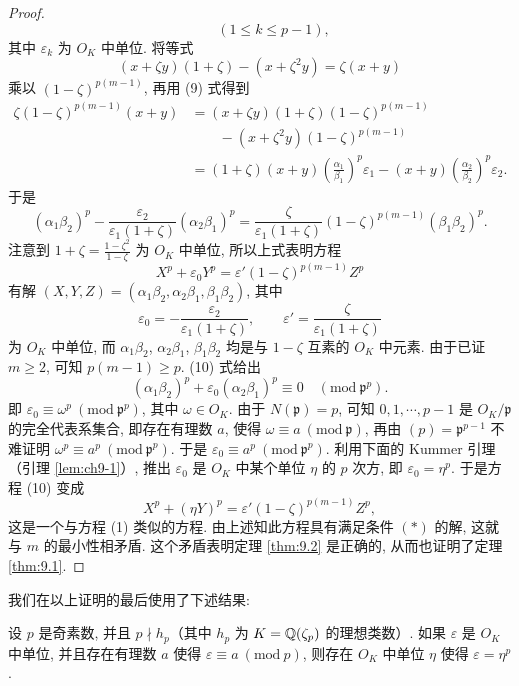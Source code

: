 \begin{proof}
\begin{equation}
  \qquad(1\leqslant k\leqslant p-1),
\end{equation}
其中 $\varepsilon_k$ 为 $O_K$ 中单位. 将等式
\[
  (x+\zeta y)(1+\zeta)-(x+\zeta^2y)=\zeta(x+y)
\]
乘以 $(1-\zeta)^{p(m-1)}$, 再用 (9) 式得到
\[
  \begin{aligned}
    \zeta(1-\zeta)^{p(m-1)}(x+y)&=(x+\zeta y)(1+\zeta)(1-\zeta)^{p(m-1)}\\
    &\qquad-(x+\zeta^2y)(1-\zeta)^{p(m-1)}\\
    &=(1+\zeta)(x+y)\left(\frac{\alpha_1}{\beta_1}\right)^p\varepsilon_1
    -(x+y)\left(\frac{\alpha_2}{\beta_2}\right)^p\varepsilon_2.
  \end{aligned}
\]
于是
\[
  \left(\alpha_1\beta_2\right)^p-\frac{\varepsilon_2}{\varepsilon_1(1+\zeta)}\left(\alpha_2\beta_1\right)^p
  =\frac{\zeta}{\varepsilon_1(1+\zeta)}(1-\zeta)^{p(m-1)}\left(\beta_1\beta_2\right)^p.
\]
注意到 $1+\zeta=\frac{1-\zeta^2}{1-\zeta}$ 为 $O_K$ 中单位, 所以上式表明方程
\begin{equation}\tag{10}
  X^p+\varepsilon_0Y^p=\varepsilon'(1-\zeta)^{p(m-1)}Z^p
\end{equation}
有解 $(X,Y,Z)=(\alpha_1\beta_2,\alpha_2\beta_1,\beta_1\beta_2)$, 其中
\[
  \varepsilon_0=-\frac{\varepsilon_2}{\varepsilon_1(1+\zeta)},\qquad
  \varepsilon'=\frac{\zeta}{\varepsilon_1(1+\zeta)}
\]
为 $O_K$ 中单位, 而 $\alpha_1\beta_2$, $\alpha_2\beta_1$, $\beta_1\beta_2$ 均是与 $1-\zeta$ 互素的 $O_K$ 中元素. 由于已证 $m\geqslant 2$, 可知 $p(m-1)\geqslant p$. (10) 式给出
\[
  (\alpha_1\beta_2)^p+\varepsilon_0(\alpha_2\beta_1)^p\equiv 0\quad(\mathrm{mod}\ \mathfrak{p}^p).
\]
即 $\varepsilon_0\equiv\omega^p\ (\mathrm{mod}\ \mathfrak{p}^p)$, 其中 $\omega\in O_K$. 由于 $N(\mathfrak{p})=p$, 可知 $0,1,\cdots,p-1$ 是 $O_K/\mathfrak{p}$ 的完全代表系集合, 即存在有理数 $a$, 使得 $\omega\equiv a\ (\mathrm{mod}\ \mathfrak{p})$, 再由 $(p)=\mathfrak{p}^{p-1}$ 不难证明 $\omega^p\equiv a^p\ (\mathrm{mod}\ \mathfrak{p}^p)$. 于是 $\varepsilon_0\equiv a^p\ (\mathrm{mod}\ \mathfrak{p}^p)$. 利用下面的 Kummer 引理（引理 \ref{lem:ch9-1}）, 推出 $\varepsilon_0$ 是 $O_K$ 中某个单位 $\eta$ 的 $p$ 次方, 即 $\varepsilon_0=\eta^p$. 于是方程 (10) 变成
\[
  X^p+(\eta Y)^p=\varepsilon'(1-\zeta)^{p(m-1)}Z^p,
\]
这是一个与方程 (1) 类似的方程. 由上述知此方程具有满足条件 $(*)$ 的解, 这就与 $m$ 的最小性相矛盾. 这个矛盾表明定理 \ref{thm:9.2} 是正确的, 从而也证明了定理 \ref{thm:9.1}.
\end{proof}

我们在以上证明的最后使用了下述结果:

\begin{lemma}\label{lem:ch9-1}
设 $p$ 是奇素数, 并且 $p\nmid h_p$（其中 $h_p$ 为 $K=\mathbb{Q}(\zeta_p)$ 的理想类数）. 如果 $\varepsilon$ 是 $O_K$ 中单位, 并且存在有理数 $a$ 使得 $\varepsilon\equiv a\ (\mathrm{mod}\ p)$, 则存在 $O_K$ 中单位 $\eta$ 使得 $\varepsilon=\eta^p$.
\end{lemma}

